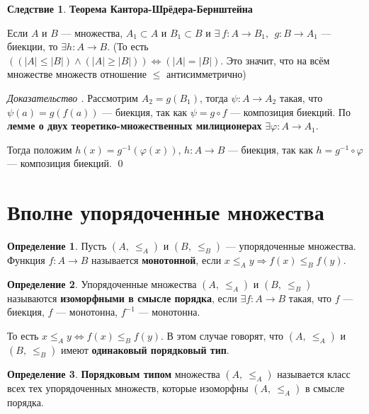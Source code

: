 \documentclass[12pt,oneside]{article}
\theoremstyle{definition}
\newtheorem{definition}{Определение}
\newtheorem{corollary}{Следствие}[section]
\newenvironment{ourproof}[1]{\textit{Доказательство #1.}}{\qed}
\begin{document}
\begin{corollary}\textbf{Теорема Кантора-Шрёдера-Бернштейна}\label{KSHB}

Если $A$ и $B$ --- множества, $A_1\subset A$ и $B_1\subset B$ и $\exists\ f : A \longrightarrow B_1,\ \ g : B \longrightarrow A_1$ --- биекции, то $\exists h : A\longrightarrow B$. (То есть $ ((|A|\leqslant |B|)\wedge (|A|\geqslant |B|)) \Longleftrightarrow (|A|=|B|)$. Это значит, что на всём множестве множеств отношение $\leqslant$ антисимметрично)
\end{corollary}

\begin{ourproof}{}
Рассмотрим $A_2=g(B_1)$, тогда $\psi : A \longrightarrow A_2$ такая, что $\psi(a) = g(f(a))$ --- биекция, так как $\psi = g\circ f$ --- композиция биекций. По \textbf{лемме о двух теоретико-множественных милиционерах} $\exists \varphi : A\longrightarrow A_1$.

Тогда положим $h(x)=g^{-1}(\varphi(x))$, $h : A \longrightarrow B$ --- биекция, так как $h = g^{-1}\circ \varphi$ --- композиция биекций.
\end{ourproof}

\section{Вполне упорядоченные множества}

\begin{definition}
Пусть $(A,\ \leqslant_A)$ и $(B,\ \leqslant_B)$ --- упорядоченные множества. Функция $f: A \longrightarrow B$ называется \textbf{монотонной}, если $x \leqslant_A y \Longrightarrow f(x) \leqslant_B f(y)$.
\end{definition}

\begin{definition}
Упорядоченные множества $(A,\ \leqslant_A)$ и $(B,\ \leqslant_B)$ называются \textbf{изоморфными в смысле порядка}, если $\exists f: A \longrightarrow B$ такая, что $f$ --- биекция, $f$ --- монотонна, $f^{-1}$ --- монотонна.

То есть $x \leqslant_A y \Longleftrightarrow f(x) \leqslant_B f(y)$. В этом случае говорят, что $(A,\ \leqslant_A)$ и $(B,\ \leqslant_B)$ имеют \textbf{одинаковый порядковый тип}.
\end{definition}

\begin{definition}
\textbf{Порядковым типом} множества $(A,\ \leqslant_A)$ называется класс всех тех упорядоченных множеств, которые изоморфны $(A,\ \leqslant_A)$ в смысле порядка.
\end{definition}
\end{document}
